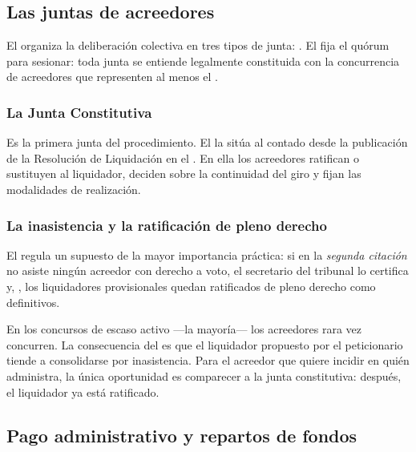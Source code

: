 \subsection{Las juntas de acreedores}

El  organiza la deliberación colectiva en tres tipos de junta: . El  fija el quórum para sesionar: toda junta se entiende
legalmente constituida con la concurrencia de acreedores que representen al menos el
.

\subsubsection{La Junta Constitutiva}

Es la primera junta del procedimiento. El  la sitúa al 
contado desde la publicación de la Resolución de Liquidación en el \boletin{}. En ella los
acreedores ratifican o sustituyen al liquidador, deciden sobre la continuidad del giro y fijan
las modalidades de realización.

\subsubsection{La inasistencia y la ratificación de pleno derecho}

El  regula un supuesto de la mayor importancia práctica: si en la \emph{segunda
citación} no asiste ningún acreedor con derecho a voto, el secretario del tribunal lo certifica
y, , los liquidadores provisionales quedan
ratificados de pleno derecho como definitivos.

\begin{foco}
En los concursos de escaso activo ---la mayoría--- los acreedores rara vez concurren. La
consecuencia del  es que el liquidador propuesto por el peticionario tiende a
consolidarse por inasistencia. Para el acreedor que quiere incidir en quién administra, la única
oportunidad es comparecer a la junta constitutiva: después, el liquidador ya está ratificado.
\end{foco}

\subsection{Pago administrativo y repartos de fondos}

